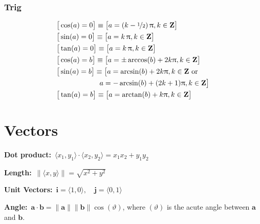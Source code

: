 \documentclass[letterpaper,9pt,fleqn]{extarticle}
\newcommand{\integers}{\mathbf{Z}}
\begin{document}
\begin{multicols*}{3}
\subsubsection*{Trig}
\vspace{-0.2in}
\begin{minipage}[c]{0.33333333333333\textwidth}
\begin{align*}
&\big [\cos(a) = 0 \big ]  \equiv  \big [a =  (k - \nicefrac{1}{2}) \, \uppi, k \in \integers \big ]\\
&\big [\sin(a) = 0 \big ]  \equiv  \big [ a = k \, \uppi, k \in \integers \big ] \\
&\big [\tan(a) = 0 \big ]  \equiv  \big [ a = k \, \uppi, k \in \integers \big ] \\
&\big [\cos(a) = b  \big] \equiv \big [a = \pm \arccos(b) + 2 k \uppi, k \in \integers \big ]\\
&\big [\sin(a) = b  \big] \equiv \big [a = \arcsin(b) +  2 k \uppi,  k \in \integers \mbox{ or } \\
&\quad \quad \quad \quad \quad \quad  a = -\arcsin(b) + (2k + 1)\uppi, k \in \integers \big ] \\        
&\big [\tan(a) = b  \big] \equiv \big [a = \arctan(b) +  k \uppi , k \in \integers\big ]
\end{align*}
\end{minipage}

\section*{Vectors}
\vspace{-0.3in}
\textbf{Dot product:}\,
\(
    \langle x_1, y_1 \rangle \cdot 
    \langle x_2, y_2 \rangle = x_1 x_2 + y_1 y_2
\)

\textbf{Length:}\,
\(
  \|  \langle x, y \rangle \| = \sqrt{x^2+ y^2}
\)

\textbf{Unit Vectors:}\,
\(
    \mathbf{i} = \langle 1,0 \rangle, \quad
    \mathbf{j} = \langle 0,1 \rangle
\)

\textbf{Angle:}\, \(\mathbf{a} \cdot \mathbf{b} = \|\mathbf{a}\| \|\mathbf{b}\| \cos(\vartheta)\), where \((\vartheta) \) is
the acute angle between \(\mathbf{a}\) and \(\mathbf{b}\).
\end{multicols*}
\vfill

\newpage

\begin{comment}
\subsubsection*{Trig (continued)}

$\big [\sin(a) = b  \big] \equiv \begin{cases} a = \sin^{-1}(b) + 2 k \uppi  \mbox{ \textbf{or} } a = -\sin^{-1}(b) + (2 k + 1) \uppi \big ] &\mbox{ if } b \in [-1,1] \\
  \varnothing  & \mbox{ if } b \notin [-1,1] \end{cases}$
\end{comment}
\end{document}
